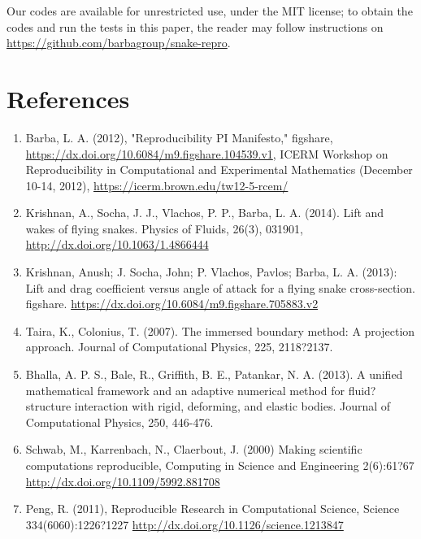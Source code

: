 \documentclass[9pt,twocolumn,twoside]{article}
\newlength{\up}
\begin{document}
Our codes are available for unrestricted use, under the MIT license; to obtain the codes and run the tests in this paper, the reader may follow instructions on \url{https://github.com/barbagroup/snake-repro}.
 

\section*{References}
{\footnotesize
\begin{enumerate}
\item Barba, L. A. (2012), "Reproducibility PI Manifesto," figshare, \url{https://dx.doi.org/10.6084/m9.figshare.104539.v1}, ICERM Workshop on Reproducibility in Computational and Experimental Mathematics (December 10-14, 2012), \url{https://icerm.brown.edu/tw12-5-rcem/} 

\item Krishnan, A., Socha, J. J., Vlachos, P. P., Barba, L. A. (2014). Lift and wakes of flying snakes. Physics of Fluids, 26(3), 031901, \url{http://dx.doi.org/10.1063/1.4866444}

\item Krishnan, Anush; J. Socha, John; P. Vlachos, Pavlos; Barba, L. A. (2013): Lift and drag coefficient versus angle of attack for a flying snake cross-section. figshare. \url{https://dx.doi.org/10.6084/m9.figshare.705883.v2}

\item Taira, K., Colonius, T. (2007). The immersed boundary method: A projection approach. Journal of Computational Physics, 225, 2118?2137.

\item Bhalla, A. P. S., Bale, R., Griffith, B. E., Patankar, N. A. (2013). A unified mathematical framework and an adaptive numerical method for fluid?structure interaction with rigid, deforming, and elastic bodies. Journal of Computational Physics, 250, 446-476.

\item Schwab, M., Karrenbach, N., Claerbout, J. (2000) Making scientific computations reproducible, Computing in Science and Engineering 2(6):61?67 \url{http://dx.doi.org/10.1109/5992.881708}

\item Peng, R. (2011), Reproducible Research in Computational Science, Science 334(6060):1226?1227 \url{http://dx.doi.org/10.1126/science.1213847}

\end{enumerate}
}
\end{document}
